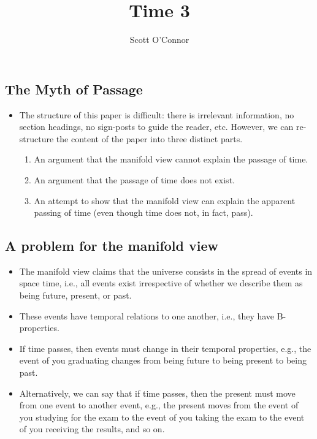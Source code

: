 \documentclass[]{article}
\title{Time 3}
\author{Scott O’Connor}
\begin{document}
\maketitle


\subsection{The Myth of Passage}

\begin{itemize}
\item The structure of this paper is difficult: there is irrelevant information, no section headings, no sign-posts to guide the reader, etc. However, we can re-structure the content of the paper into three distinct parts. 
\begin{enumerate}
\item An argument that the manifold view cannot explain the passage of time. 
\item An argument that the passage of time does not exist. 
\item An attempt to show that the manifold view can explain the apparent passing of time (even though time does not, in fact, pass). 
\end{enumerate}
\end{itemize}

\subsection{A problem for the manifold view}

\begin{itemize}
\item The manifold view claims that the universe consists in the spread of events in space time, i.e., all events exist irrespective of whether we describe them as being future, present, or past.  
\item These events have temporal relations to one another, i.e., they have B-properties. 
\item If time passes, then events must change in their temporal properties, e.g., the event of you graduating changes from being future to being present to being past. 
\item Alternatively, we can say that if time passes, then the present must move from one event to another event, e.g., the present moves from the event of you studying for the exam to the event of you taking the exam to the event of you receiving the results, and so on. 
\end{itemize}
\end{document}
